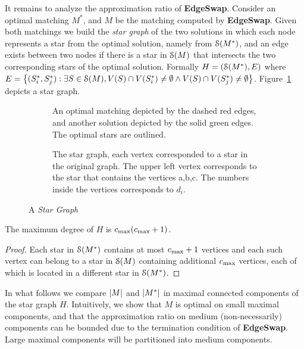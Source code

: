 It remains to analyze the approximation ratio of \textbf{EdgeSwap}.
Consider an optimal matching $M^*$, and $M$ be the matching computed
by \textbf{EdgeSwap}.  Given both matchings we build the \emph{star
graph} of the two solutions in which each node represents a star from
the optimal solution, namely from $\mathcal{S}(M^*)$, and an edge exists
between two nodes if there is a star in $\mathcal{S}(M)$ that intersects the
two corresponding stars of the optimal solution.
%
Formally $H = (\mathcal{S}(M^*), E)$ where
$
{E = \left\{ (S^*_i, S^*_j) : \exists S \in \mathcal{S}(M), 
         V(S) \cap V(S^*_i) \neq \emptyset \land
         V(S) \cap V(S^*_j) \neq \emptyset \right\}}
$.
Figure~\ref{fig:conflict} depicts a star graph.

\begin{figure}[t]
\centering
%
\begin{subfigure}[t]{.45\linewidth}
\centering
\caption{
An optimal matching depicted by the dashed red edges,
and another solution depicted by the solid green edges.
The optimal stars are outlined.  
}

\end{subfigure}
%
\hfill
%
\begin{subfigure}[t]{.53\linewidth}
\centering
\caption{
The star graph, each vertex corresponded to a star in the original graph. 
The upper left vertex corresponds to the star that contains the vertices a,b,c.
The numbers inside the vertices corresponds to $d_i$.   
}

\end{subfigure}
%
\caption{A \emph{Star Graph}}
\label{fig:conflict}
\end{figure}  

\begin{lemma}
The maximum degree of $H$ is $c_{\max}(c_{\max}+1)$.
\end{lemma}
\begin{proof}
Each star in $\mathcal{S}(M^*)$ contains at most $c_{\max}+1$ vertices and each
such vertex can belong to a star in $\mathcal{S}(M)$ containing additional
$c_{\max}$ vertices, each of which is located in a different star in
$\mathcal{S}(M^*)$.
\end{proof}

In what follows we compare $\left| M \right|$ and $\left| M^* \right|$ in maximal
connected components of the star graph $H$.  Intuitively, we show that
$M$ is optimal on small maximal components, and that the approximation
ratio on medium (non-necessarily) components can be bounded due to the
termination condition of \textbf{EdgeSwap}.  Large maximal components
will be partitioned into medium components.

